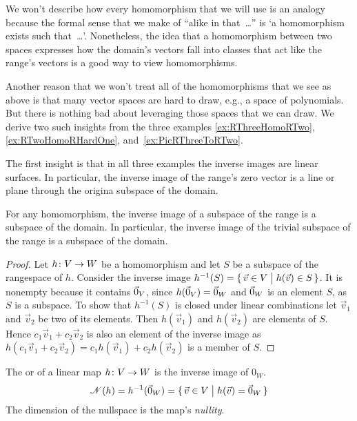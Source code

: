 We won't describe how every homomorphism that we will use
is an analogy because the formal
sense that we make of ``alike in that~\ldots'' is 
`a homomorphism exists such that~\ldots'.
Nonetheless, the idea that a homomorphism between two spaces expresses how
the domain's vectors fall into classes that act like
the range's vectors is a good way to view homomorphisms.

Another reason that we won't treat all of the homomorphisms that
we see as above is that many vector spaces are hard to draw,
e.g., a space of polynomials.
But there is nothing bad about leveraging those spaces
that we can draw.
We derive two such insights from the three examples
\ref{ex:RThreeHomoRTwo}, \ref{ex:RTwoHomoRHardOne}, 
and~\ref{ex:PicRThreeToRTwo}.

The first insight is that in all three examples the inverse images are
linear surfaces.
In particular, the inverse image of the range's zero vector is a line or plane
through the origin\Dash a subspace of the domain.

\begin{lemma}  \label{le:NullspIsSubSp}
For any homomorphism, the inverse image of a subspace of the range 
is a subspace of the domain.
In particular, the inverse image of the trivial subspace of the range
is a subspace of the domain.
\end{lemma}

\begin{proof}
Let $\mbox{$h\colon V\to W$}$ be a homomorphism
and let $S$ be a subspace of the rangespace of $h$.
Consider the inverse image
$h^{-1}(S)=\mbox{$\{\,\vec{v}\in V\bigm| h(\vec{v})\in S\,\}$}$.
It is nonempty because it contains $\vec{0}_V$, since
\( h(\vec{0}_V)=\vec{0}_W \) and \( \vec{0}_W \) is an element $S$, 
as $S$ is a subspace.
To show that $h^{-1}(S)$ is closed under linear combinations let
\( \vec{v}_1 \) and \( \vec{v}_2 \) be two of its elements.
Then
$h(\vec{v}_1)$ and $h(\vec{v}_2)$ are elements of $S$.
Hence $c_1\vec{v}_1+c_2\vec{v}_2$
is also an element of the inverse image as
$h(c_1\vec{v}_1+c_2\vec{v}_2)
  =c_1h(\vec{v}_1)+c_2h(\vec{v}_2)$
is a member of $S$. 
\end{proof}

\begin{definition}
The 
or  of a linear map
\( \mbox{$h\colon V\to W$} \) is the inverse image of $0_W$.
\begin{equation*}
  \mathscr{N}(h)=h^{-1}(\vec{0}_W)=\mbox{$\{\,\vec{v}\in V\bigm| h(\vec{v})=\vec{0}_W\,\}$}
\end{equation*}
The dimension of the nullspace is the map's
{\em nullity}.
\end{definition}

